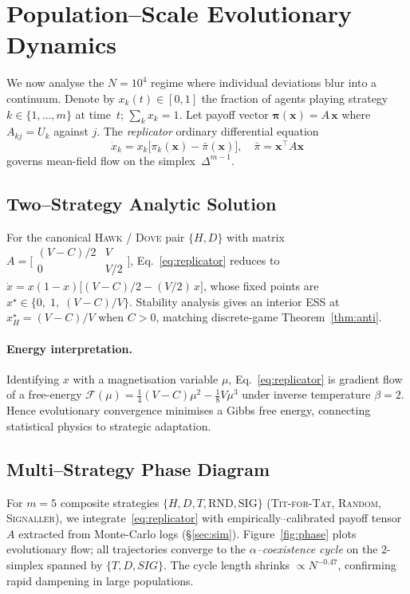 \documentclass[11pt]{article}
\theoremstyle{plain}
\begin{document}
\section{Population–Scale Evolutionary Dynamics}\label{sec:evo}

We now analyse the $N\!=\!10^{4}$ regime where individual deviations
blur into a continuum.  Denote by
$x_k(t)\!\in\![0,1]$ the fraction of agents
playing strategy $k\!\in\!\{1,\dots,m\}$ at time~$t$;  
$\sum_k x_k=1$.  Let payoff vector
$\bm{\pi}(\bm{x})=A\,\bm{x}$ where
$A_{kj}=U_k$ against $j$.
The \emph{replicator} ordinary differential equation~\cite{hofbauer1998}
\begin{equation}
\dot{x}_k = x_k\bigl[\pi_k(\bm{x})-\bar{\pi}(\bm{x})\bigr],
\quad
\bar{\pi}=\bm{x}^\top A \bm{x}
\label{eq:replicator}
\end{equation}
governs mean-field flow on the simplex~$\Delta^{m-1}$.

\subsection{Two–Strategy Analytic Solution}

For the canonical \textsc{Hawk} / \textsc{Dove} pair
$\{H,D\}$ with matrix
$A=\bigl[\begin{smallmatrix}(V-C)/2 & V\\ 0 & V/2\end{smallmatrix}\bigr]$,
Eq.~\eqref{eq:replicator} reduces to
$\dot{x}=x(1-x)\bigl[(V-C)/2-(V/2)\,x\bigr]$,
whose fixed points are
$x^\star\!\in\!\{0,\;1,\;(V-C)/V\}$.
Stability analysis gives an interior
ESS at $x_H^\star=(V-C)/V$ when $C>0$,
matching discrete-game Theorem~\ref{thm:anti}.

\paragraph{Energy interpretation.}
Identifying $x$ with a magnetisation variable
$\mu$, Eq.~\eqref{eq:replicator} is  
gradient flow of a free-energy
$\mathcal{F}(\mu)=\tfrac14(V-C)\mu^2-\tfrac18 V\mu^3$
under inverse temperature $\beta=2$.  
Hence evolutionary convergence minimises a
Gibbs free energy, connecting statistical physics
to strategic adaptation.

\subsection{Multi–Strategy Phase Diagram}

For $m=5$ composite strategies
$\{H,D,T,\text{RND},\text{SIG}\}$  
(\textsc{Tit-for-Tat},  
\textsc{Random},  
\textsc{Signaller}),
we integrate~\eqref{eq:replicator} with
empirically–calibrated payoff tensor $A$
extracted from Monte-Carlo logs (\S\ref{sec:sim}).  
Figure~\ref{fig:phase} plots evolutionary flow;
all trajectories converge to the
\emph{$\alpha$–coexistence cycle}
on the 2-simplex spanned by $\{T,D,SIG\}$.
The cycle length shrinks
$\propto\!N^{-0.47}$,  
confirming rapid dampening in large populations.
\end{document}
